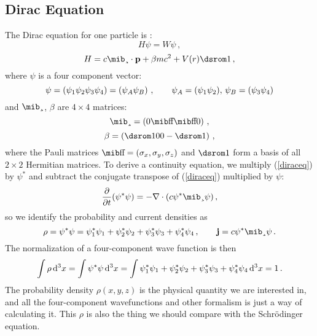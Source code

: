 \subsection{Dirac Equation}

The Dirac equation for one particle is \cite{strange,zabloudil}: 
\begin{equation}
  H\psi=W\psi\,,  \label{diraceq}
\end{equation}
\begin{equation*}
  H=c\balpha\cdot{\bf p}+\beta mc^2+V(r)\hbox{\dsrom1}\,,
\end{equation*}
where $\psi$ is a four component vector: 
\begin{equation*}
  \psi=\left({\psi_1\psi_2\psi_3\psi_4}\right) =\left({\psi_A\psi_B}\right)\,,\qquad \psi_A=\left({\psi_1\psi_2}\right)\!,\,\psi_B=\left({\psi_3\psi_4}\right)
\end{equation*}
and $\balpha$, $\beta$ are $4\times4$ matrices: 
\begin{equation*}
  \balpha=\mat{0}{\bsigma}{\bsigma}{0}\,,
\end{equation*}
\begin{equation*}
  \beta=\mat{\hbox{\dsrom1}}{0}{0}{-\hbox{\dsrom1}}\,,
\end{equation*}
where the Pauli matrices $\bsigma=(\sigma_x,\sigma_y,\sigma_z)$ and $\hbox{\dsrom1}$ form a basis of all $2\times2$ Hermitian matrices. To derive a continuity equation, we multiply (\ref{diraceq}) by $\psi^*$ and subtract the conjugate transpose of (\ref{diraceq}) multiplied by $\psi$: 
\begin{equation*}
  \p{}{t}(\psi^*\psi)=-\nabla\cdot(c\psi^*\balpha\psi)\,,
\end{equation*}
so we identify the probability and current densities as 
\begin{equation*}
  \rho=\psi^*\psi=\psi_1^*\psi_1+\psi_2^*\psi_2+\psi_3^*\psi_3+\psi_4^*\psi_4\,, \qquad {\bf j}=c\psi^*\balpha\psi\,.
\end{equation*}
The normalization of a four-component wave function is then 
\begin{equation}
  \int \rho \,{\rm d}^3x= \int \psi^*\psi \,{\rm d}^3x= \int \psi_1^*\psi_1+\psi_2^*\psi_2+\psi_3^*\psi_3+\psi_4^*\psi_4 \,{\rm d}^3x= 1\,.  \label{norm}
\end{equation}
The probability density $\rho(x,y,z)$ is the physical quantity we are interested in, and all the four-component wavefunctions and other formalism is just a way of calculating it. This $\rho$ is also the thing we should compare with the Schrödinger equation.

